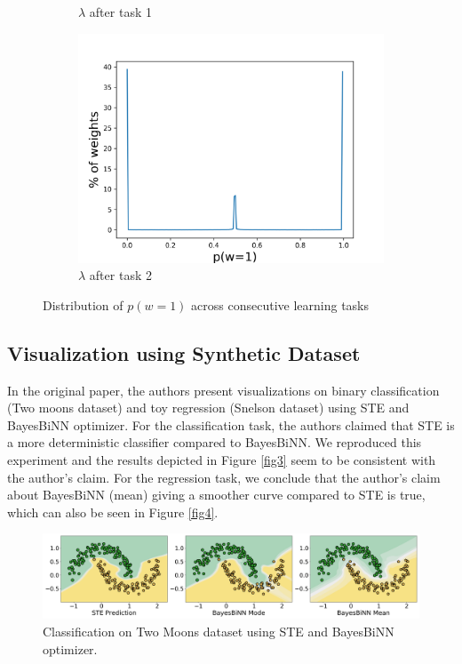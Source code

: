\begin{figure}[h]
\begin{subfigure}[b]{0.3\textwidth}
         \caption{$\lambda$ after task 1}
     \end{subfigure}
     \hfill
     \begin{subfigure}[b]{0.3\textwidth}
         \centering
         \includegraphics[width=1.1\textwidth]{../openreview/figs/after_task_2.png}
         \caption{$\lambda$ after task 2}
     \end{subfigure}
        \caption{Distribution of $p(w=1)$ across consecutive learning tasks}
\end{figure}

\subsection{Visualization using Synthetic Dataset}

In the original paper, the authors present visualizations on binary classification (Two moons dataset\citet{r10}) and toy regression (Snelson dataset\citet{r9}) using STE and BayesBiNN optimizer. For the classification task, the authors claimed that STE is a more deterministic classifier compared to BayesBiNN. We reproduced this experiment and the results depicted in Figure \autoref{fig3} seem to be consistent with the author's claim. For the regression task, we conclude that the author's claim about BayesBiNN (mean) giving a smoother curve compared to STE is true, which can also be seen in Figure \autoref{fig4}. 


\begin{figure}[h]
     \centering
         \includegraphics[width=1\textwidth]{../openreview/figs/TwoMoon.png}
         \caption{Classification on Two Moons dataset using STE and BayesBiNN optimizer.}
         \label{fig3}
\end{figure}

